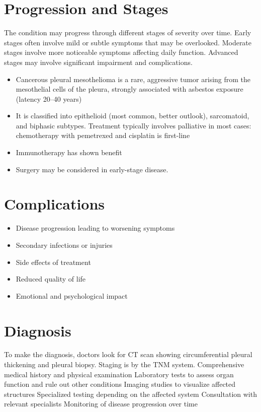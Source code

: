 \section{Progression and Stages}
The condition may progress through different stages of severity over time. Early stages often involve mild or subtle symptoms that may be overlooked. Moderate stages involve more noticeable symptoms affecting daily function. Advanced stages may involve significant impairment and complications.

\begin{itemize}[noitemsep]
  \item Cancerous pleural mesothelioma is a rare, aggressive tumor arising from the mesothelial cells of the pleura, strongly associated with asbestos exposure (latency 20--40 years)
  \item It is classified into epithelioid (most common, better outlook), sarcomatoid, and biphasic subtypes. Treatment typically involves palliative in most cases: chemotherapy with pemetrexed and cisplatin is first-line
  \item Immunotherapy has shown benefit
  \item Surgery may be considered in early-stage disease.
\end{itemize}
\section{Complications}
\begin{itemize}[noitemsep]
  \item Disease progression leading to worsening symptoms
  \item Secondary infections or injuries
  \item Side effects of treatment
  \item Reduced quality of life
  \item Emotional and psychological impact
\end{itemize}
\section{Diagnosis}
To make the diagnosis, doctors look for CT scan showing circumferential pleural thickening and pleural biopsy. Staging is by the TNM system. Comprehensive medical history and physical examination Laboratory tests to assess organ function and rule out other conditions Imaging studies to visualize affected structures Specialized testing depending on the affected system Consultation with relevant specialists Monitoring of disease progression over time

